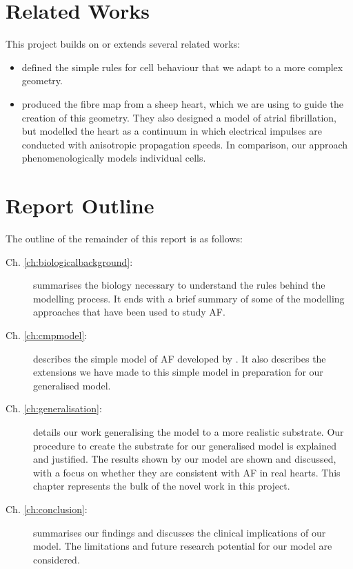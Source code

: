\section{Related Works}

This project builds on or extends several related works:
\begin{itemize}
    \item {} defined the simple rules for cell behaviour that we adapt to a more complex geometry. 
    \item {} produced the fibre map from a sheep heart, which we are using to guide the creation of this geometry. They also designed a model of atrial fibrillation, but modelled the heart as a continuum in which electrical impulses are conducted with anisotropic propagation speeds. In comparison, our approach phenomenologically models individual cells.
\end{itemize}

\section{Report Outline}

The outline of the remainder of this report is as follows:
\begin{description}
    \item[Ch. \ref{ch:biologicalbackground}: ] summarises the biology necessary to understand the rules behind the modelling process. It ends with a brief summary of some of the modelling approaches that have been used to study AF.
    \item[Ch. \ref{ch:cmpmodel}: ] describes the simple model of AF developed by . It also describes the extensions we have made to this simple model in preparation for our generalised model.
    \item[Ch. \ref{ch:generalisation}: ] details our work generalising the \cmp model to a more realistic substrate. Our procedure to create the substrate for our generalised model is explained and justified. The results shown by our model are shown and discussed, with a focus on whether they are consistent with AF in real hearts. This chapter represents the bulk of the novel work in this project.
    \item[Ch. \ref{ch:conclusion}: ] summarises our findings and discusses the clinical implications of our model. The limitations and future research potential for our model are considered.
\end{description}